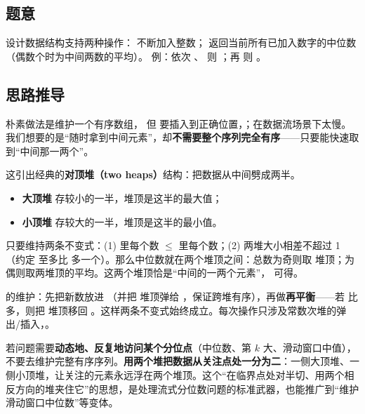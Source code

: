 
\subsection*{题意}
设计数据结构支持两种操作： 不断加入整数； 返回当前所有已加入数字的中位数（偶数个时为中间两数的平均）。
例：依次 、 则 ；再  则 。

\subsection*{思路推导}
朴素做法是维护一个有序数组，  但  要插入到正确位置，；在数据流场景下太慢。我们想要的是“随时拿到中间元素”，却\textbf{不需要整个序列完全有序}——只要能快速取到“中间那一两个”。

这引出经典的\textbf{对顶堆（two heaps）}结构：把数据从中间劈成两半。
\begin{itemize}
  \item \textbf{大顶堆}  存较小的一半，堆顶是这半的最大值；
  \item \textbf{小顶堆}  存较大的一半，堆顶是这半的最小值。
\end{itemize}
只要维持两条不变式：(1)  里每个数 $\le$  里每个数；(2) 两堆大小相差不超过 1（约定  至多比  多一个）。那么中位数就在两个堆顶之间：总数为奇则取  堆顶；为偶则取两堆顶的平均。这两个堆顶恰是“中间的一两个元素”， 可得。

 的维护：先把新数放进 （并把  堆顶弹给 ，保证跨堆有序），再做\textbf{再平衡}——若  比  多，则把  堆顶移回 。这样两条不变式始终成立。每次操作只涉及常数次堆的弹出/插入，。

\begin{idea}
若问题需要\textbf{动态地、反复地访问某个分位点}（中位数、第 $k$ 大、滑动窗口中值），不要去维护完整有序序列。\textbf{用两个堆把数据从关注点处一分为二}：一侧大顶堆、一侧小顶堆，让关注的元素永远浮在两个堆顶。这个“在临界点处对半切、用两个相反方向的堆夹住它”的思想，是处理流式分位数问题的标准武器，也能推广到“维护滑动窗口中位数”等变体。
\end{idea}

